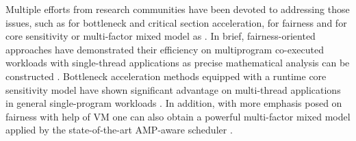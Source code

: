 \documentclass[sigplan,review,anonymous]{acmart}\settopmatter{printfolios=true,printccs=false,printacmref=false}
\begin{document}
Multiple efforts from research communities have been devoted to addressing those issues, such as \cite{han2018multicore,chronaki2017task,joao2012bottleneck,suleman2009accelerating,du2013criticality} for bottleneck and critical section acceleration, \cite{zahedi2018amdahl,wang2016rebudget,van2012scheduling,li2009efficient,li2007efficient} for fairness and \cite{cao2012yin,kumar2004single,becchi2006dynamic} for core sensitivity or multi-factor mixed model as \cite{kim2018exploring,kim2016fairness,saez2012leveraging,van2013fairness,joao2013utility,jibaja2016portable}. 
In brief, fairness-oriented approaches have demonstrated their efficiency on multiprogram co-executed workloads with single-thread applications as precise mathematical analysis can be constructed \cite{kim2016fairness, kim2018exploring}. Bottleneck acceleration methods equipped with a runtime core sensitivity model have shown significant advantage on multi-thread applications in general single-program workloads \cite{joao2012bottleneck,joao2013utility}. In addition, with more emphasis posed on fairness with help of VM one can also obtain a powerful multi-factor mixed model applied by the state-of-the-art AMP-aware scheduler \cite{jibaja2016portable}. 
\end{document}
